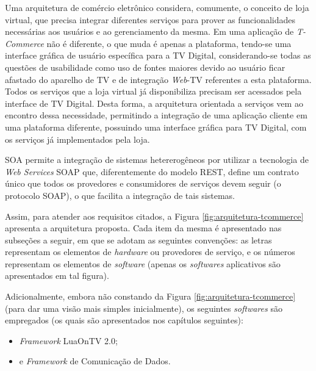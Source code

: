 Uma arquitetura de comércio eletrônico considera, comumente, o conceito de loja virtual, 
que precisa integrar diferentes serviços para prover as funcionalidades
necessárias aos usuários e ao gerenciamento da mesma. Em uma aplicação de \textit{T-Commerce}
não é diferente, o que muda é apenas a plataforma, tendo-se uma interface gráfica
de usuário específica para a TV Digital, considerando-se todas as questões
de usabilidade como uso de fontes maiores devido ao usuário
ficar afastado do aparelho de TV e de integração \textit{Web}-TV referentes a esta plataforma. 
Todos os serviços que a loja virtual já disponibiliza
precisam ser acessados pela interface de TV Digital. Desta forma, a arquitetura
orientada a serviços vem ao encontro dessa necessidade, permitindo a integração
de uma aplicação cliente em uma plataforma diferente, possuindo uma interface gráfica
para TV Digital, com os serviços já implementados pela loja.

SOA permite a integração de sistemas hetererogêneos por utilizar a tecnologia de \textit{Web Services} SOAP
que, diferentemente do modelo REST, define um contrato único que todos os provedores e consumidores
de serviços devem seguir (o protocolo SOAP), o que facilita a integração de tais sistemas.

\begin{comment}
Assim, para atender aos requisitos citados, a Figura \ref{fig:arquitetura-tcommerce} apresenta a arquitetura proposta.
Cada item da mesma é apresentado nas subseções a seguir, em que são representados os elementos de \textit{hardware}
ou provedores de serviço, bem como os elementos de \textit{software} (apenas os \textit{softwares} aplicativos são apresentados em tal figura). 
\end{comment}

Assim, para atender aos requisitos citados, a Figura \ref{fig:arquitetura-tcommerce} apresenta a arquitetura proposta.
Cada item da mesma é apresentado nas subseções a seguir, em que se adotam as seguintes convenções:
as letras representam os elementos de \textit{hardware}
ou provedores de serviço, e os números representam os elementos de \textit{software} (apenas os \textit{softwares} aplicativos são apresentados em tal figura). 


Adicionalmente, embora não constando da Figura \ref{fig:arquitetura-tcommerce} (para dar uma visão mais simples inicialmente), os seguintes \textit{softwares} são empregados (os quais são apresentados nos capítulos seguintes):
\begin{itemize}
	\item \textit{Framework} LuaOnTV 2.0;
	\item e \textit{Framework} de Comunicação de Dados.
\end{itemize}

